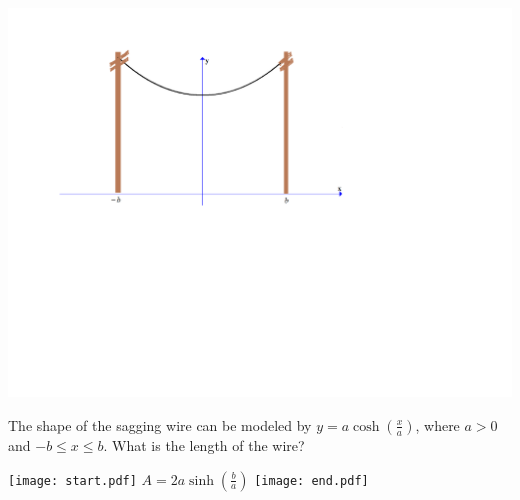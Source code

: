 \documentclass[12pt]{article}
\begin{document}
\begin{enumerate}
\begin{enumerate}
\begin{center}
\includegraphics[scale=0.6]{catenary2.pdf}
\end{center}

The shape of the sagging wire can be modeled by $y=a\cosh{\left(\frac{x}{a}\right)}$, where $a>0$ and $-b \leq x \leq b$.  What is the length of the wire?

\texttt{[image: start.pdf]}
{{$A=2a\sinh{\left(\frac{b}{a}\right)}$}}
\texttt{[image: end.pdf]}


\end{enumerate}

\end{enumerate}
\end{document}
